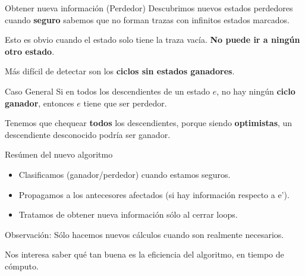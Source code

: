 \begin{frame}{Obtener nueva información (Perdedor)}
	Descubrimos nuevos estados perdedores cuando \textbf{seguro} sabemos que no forman trazas con infinitos estados marcados.
	
	\pause 
	
	Esto es obvio cuando el estado solo tiene la traza vacía. \textbf{No puede ir a ningún otro estado}.
	
	\pause 
	
	Más difícil de detectar son los \textbf{ciclos sin estados ganadores}.
	
	\pause
	
	\begin{block}{Caso General}
		Si en todos los descendientes de un estado $e$, no hay ningún \textbf{ciclo ganador}, entonces $e$ tiene que ser perdedor. 
		
		Tenemos que chequear \textbf{todos} los descendientes, porque siendo \textbf{optimistas}, un descendiente desconocido podría ser ganador.
	\end{block}
	
\end{frame}
\begin{frame}{Resúmen del nuevo algoritmo}
    \begin{itemize}
     \item Clasificamos (ganador/perdedor) cuando estamos seguros. %
     \item Propagamos a los antecesores afectados (si hay información respecto a e').
     \item Tratamos de obtener nueva información sólo al cerrar loops.
    \end{itemize}
    
    \begin{block}{Observación:}
        Sólo hacemos nuevos cálculos cuando son realmente necesarios.
    \end{block}
    
    Nos interesa saber qué tan buena es la eficiencia del algoritmo, en tiempo de cómputo.
\end{frame}


